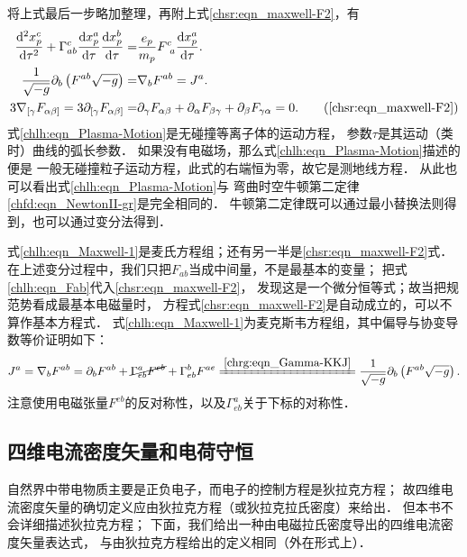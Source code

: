 将上式最后一步略加整理，再附上式\eqref{chsr:eqn_maxwell-F2}，有
\begin{align}
    \frac{{\rm d}^2 x^c_p}{{\rm d} \tau^2}
    + \Gamma^c_{ab} \frac{{\rm d} x^a_p}{{\rm d} \tau}  \frac{{\rm d}x^b_p}{{\rm d} \tau}
    =& \frac{e_p}{m_p} F_{\hphantom{c} a}^{ c} \frac{{\rm d} x^a_p}{{\rm d} \tau} .
    \label{chlh:eqn_Plasma-Motion}\\
    \frac{1}{\sqrt{-g}}\partial_b \left(F^{ab} \sqrt{-g} \right) =&
    \nabla_b F^{ab} = J^a.     \label{chlh:eqn_Maxwell-1} \\
    3\nabla_{[\gamma}F_{ \alpha \beta ]}=3\partial_{[\gamma}F_{ \alpha \beta ]}=&
    \partial_\gamma F_{ \alpha \beta } + \partial_\alpha F_{ \beta \gamma }
    + \partial_\beta F_{ \gamma \alpha } = 0. \tag{\ref{chsr:eqn_maxwell-F2}}
\end{align}
式\eqref{chlh:eqn_Plasma-Motion}是无碰撞等离子体的运动方程，
参数$\tau$是其运动（类时）曲线的弧长参数．
如果没有电磁场，那么式\eqref{chlh:eqn_Plasma-Motion}描述的便是
一般无碰撞粒子运动方程，此式的右端恒为零，故它是测地线方程．
从此也可以看出式\eqref{chlh:eqn_Plasma-Motion}与
弯曲时空牛顿第二定律\eqref{chfd:eqn_NewtonII-gr}是完全相同的．
牛顿第二定律既可以通过最小替换法则得到，也可以通过变分法得到．


式\eqref{chlh:eqn_Maxwell-1}是麦氏方程组；还有另一半是\eqref{chsr:eqn_maxwell-F2}式．
在上述变分过程中，我们只把$F_{ab}$当成中间量，不是最基本的变量；
把式\eqref{chlh:eqn_Fab}代入\eqref{chsr:eqn_maxwell-F2}，
发现这是一个微分恒等式；故当把规范势看成最基本电磁量时，
方程式\eqref{chsr:eqn_maxwell-F2}是自动成立的，可以不算作基本方程式．
式\eqref{chlh:eqn_Maxwell-1}为麦克斯韦方程组，其中偏导与协变导数等价证明如下：
\begin{equation*}
    J^a=\nabla_b F^{ab} = \partial_b F^{ab} + \cancel{\Gamma^a_{eb}F^{eb}} + \Gamma^b_{eb}F^{ae}
     \xlongequal{\ref{chrg:eqn_Gamma-KKJ}} \frac{1}{\sqrt{-g}}\partial_b \left(F^{ab} \sqrt{-g} \right) .
\end{equation*}
注意使用电磁张量$F^{eb}$的反对称性，以及$\Gamma^a_{eb}$关于下标的对称性．




\subsection{四维电流密度矢量和电荷守恒}\label{chlh:sec_charge}

自然界中带电物质主要是正负电子，而电子的控制方程是狄拉克方程；
故四维电流密度矢量的确切定义应由狄拉克方程（或狄拉克拉氏密度）来给出．
但本书不会详细描述狄拉克方程；
下面，我们给出一种由电磁拉氏密度导出的四维电流密度矢量表达式，
与由狄拉克方程给出的定义相同（外在形式上）．

